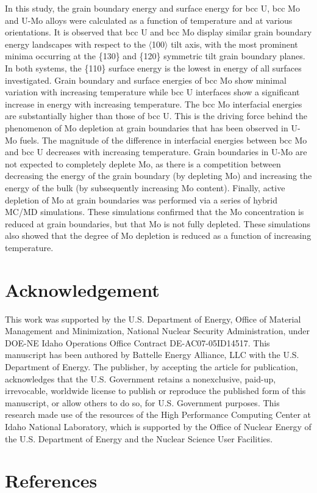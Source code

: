 \documentclass[review]{elsarticle}
\begin{document}
In this study, the grain boundary energy and surface energy for bcc U, bcc Mo and U-Mo alloys were calculated as a function of temperature and at various orientations. It is observed that bcc U and bcc Mo display similar grain boundary energy landscapes with respect to the $\langle$100$\rangle$ tilt axis, with the most prominent minima occurring at the \{130\} and \{120\} symmetric tilt grain boundary planes. In both systems, the \{110\} surface energy is the lowest in energy of all surfaces investigated. Grain boundary and surface energies of bcc Mo show minimal variation with increasing temperature while bcc U interfaces show a significant increase in energy with increasing temperature. The bcc Mo interfacial energies are substantially higher than those of bcc U. This is the driving force behind the phenomenon of Mo depletion at grain boundaries that has been observed in U-Mo fuels. The magnitude of the difference in interfacial energies between bcc Mo and bcc U decreases with increasing temperature. Grain boundaries in U-Mo are not expected to completely deplete Mo, as there is a competition between decreasing the energy of the grain boundary (by depleting Mo) and increasing the energy of the bulk (by subsequently increasing Mo content). Finally, active depletion of Mo at grain boundaries was performed via a series of hybrid MC/MD simulations. These simulations confirmed that the Mo concentration is reduced at grain boundaries, but that Mo is not fully depleted. These simulations also showed that the degree of Mo depletion is reduced as a function of increasing temperature. 



\section{Acknowledgement}
This work was supported by the U.S. Department of Energy, Office of Material Management and Minimization, National Nuclear Security Administration, under DOE-NE Idaho Operations Office Contract DE-AC07-05ID14517. This manuscript has been authored by Battelle Energy Alliance, LLC with the U.S. Department of Energy. The publisher, by accepting the article for publication, acknowledges that the U.S. Government retains a nonexclusive, paid-up, irrevocable, worldwide license to publish or reproduce the published form of this manuscript, or allow others to do so, for U.S. Government purposes. This research made use of the resources of the High Performance Computing Center at Idaho National Laboratory, which is supported by the Office of Nuclear Energy of the U.S. Department of Energy and the Nuclear Science User Facilities.

\section{References}


\end{document}

